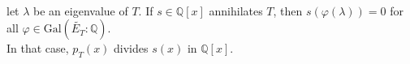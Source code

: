 \documentclass[preview]{standalone}
\begin{document}
\begin{center}
\quad\\ let $\lambda$ be an eigenvalue of $T$. If $s \in \mathbb{Q}[x]$ annihilates $T$, then $s(\varphi(\lambda)) = 0$ for all $\varphi \in \text{Gal}\left(\widetilde{E_T} : \mathbb{Q}\right)$. \quad\\[0.2cm] In that case, $p_T(x)$ divides $s(x)$ in $\mathbb{Q}[x]$.
\end{center}
\end{document}
